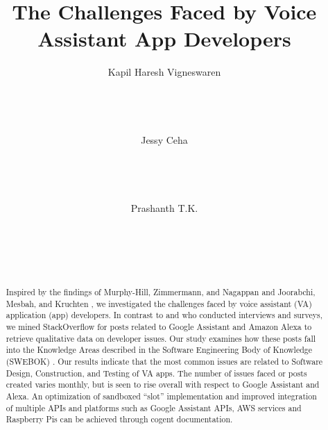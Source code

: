 \documentclass{sigchi}
\begin{document}
\title{The Challenges Faced by Voice Assistant App Developers}

\author{
  \alignauthor Kapil Haresh Vigneswaren\\
    \\
    \\
    \\
    \\
  \alignauthor Jessy Ceha\\
    \\
    \\
    \\
    \\
  \alignauthor Prashanth T.K.\\
    \\
    \\
    \\
    \\
}


\maketitle


\begin{abstract}
Inspired by the findings of Murphy-Hill, Zimmermann, and Nagappan \cite{1murphy2014cowboys} and Joorabchi, Mesbah, and Kruchten \cite{4joorabchi2013real}, we investigated the challenges faced by voice assistant (VA) application (app) developers. In contrast to \cite{1murphy2014cowboys} and \cite{4joorabchi2013real} who conducted interviews and surveys, we mined StackOverflow for posts related to Google Assistant and Amazon Alexa to retrieve qualitative data on developer issues. Our study examines how these posts fall into the Knowledge Areas described in the Software Engineering Body of Knowledge (SWEBOK) \cite{2abran2001guide}. Our results indicate that the most common issues are related to Software Design, Construction, and Testing of VA apps. The number of issues faced or posts created varies monthly, but is seen to rise overall with respect to Google Assistant and Alexa. An optimization of sandboxed ``slot'' implementation and improved integration of multiple APIs and platforms such as Google Assistant APIs, AWS services and Raspberry Pis can be achieved through cogent documentation.
\end{abstract}
\end{document}
